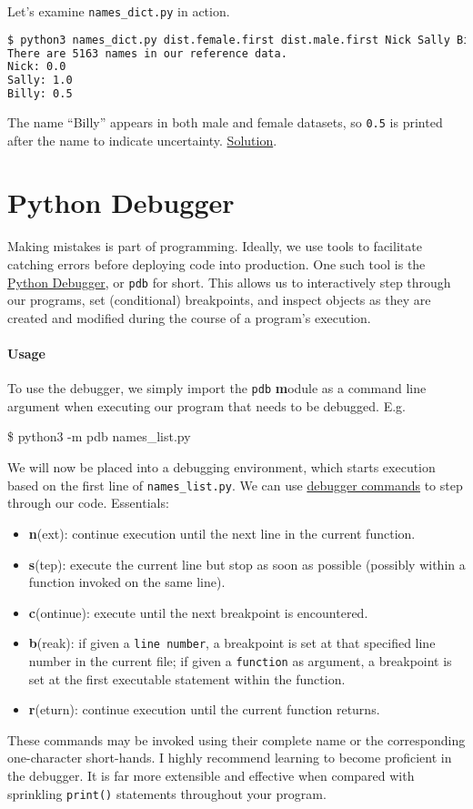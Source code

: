 \documentclass[12pt,letterpaper,twoside]{article}
\begin{document}
Let's examine \texttt{names\_dict.py} in action.

\begin{lstlisting}[language=bash]
$ python3 names_dict.py dist.female.first dist.male.first Nick Sally Billy
There are 5163 names in our reference data.
Nick: 0.0
Sally: 1.0
Billy: 0.5
\end{lstlisting}

The name ``Billy'' appears in both male and female datasets, so
\texttt{0.5} is printed after the name to indicate uncertainty.
\href{https://github.com/CME211/notes/blob/fall_18/lecture-03/names_dict.py}{Solution}.


\section{Python Debugger} Making mistakes is part of programming. Ideally, we use tools to facilitate 
catching errors before deploying code into production. One such tool is the \href{https://docs.python.org/3/library/pdb.html#debugger-commands}{Python Debugger}, or \texttt{pdb} for short. This allows us to interactively step through our programs, set (conditional) breakpoints, and inspect objects as they are created and modified during the course of a program's execution.

\paragraph{Usage} To use the debugger, we simply import the \texttt{pdb} \textbf{m}odule as a command line argument when executing our program that needs to be debugged. E.g.

\begin{shell}
\$ python3 -m pdb names\_list.py
\end{shell}

We will now be placed into a debugging environment, which starts execution based
on the first line of \texttt{names\_list.py}. We can use \href{https://docs.python.org/3/library/pdb.html#debugger-commands}{debugger commands} to step through our code. Essentials:

\begin{itemize}
  \item \textbf{n}(ext): continue execution until the next line in the current function.
  \item \textbf{s}(tep): execute the current line but stop as soon as possible (possibly within a function invoked on the same line).
  \item \textbf{c}(ontinue): execute until the next breakpoint is encountered.
  \item \textbf{b}(reak): if given a \texttt{line number}, a breakpoint is set at that specified line number in the current file; if given a \texttt{function} as argument, a breakpoint is set at the first executable statement within the function.
  \item \textbf{r}(eturn): continue execution until the current function returns.
\end{itemize} 

These commands may be invoked using their complete name or the corresponding one-character short-hands. I highly recommend learning to become proficient in the debugger. It is far more extensible and effective when compared with sprinkling \texttt{print()} statements throughout your program.
\end{document}
